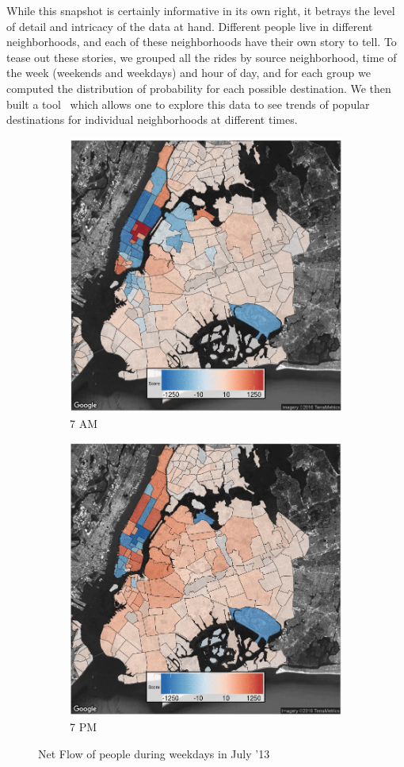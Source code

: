 \documentclass[twocolumn]{article}
\begin{document}
While this snapshot is certainly informative in its own right, it betrays the level of detail and intricacy of the data at hand. Different people live in different neighborhoods, and each of these neighborhoods have their own story to tell. To tease out these stories, we grouped all the rides by source neighborhood, time of the week (weekends and weekdays) and hour of day, and for each group we computed the distribution of probability for each possible destination. We then built a tool~\cite{DS3:2016} which allows one to explore this data to see trends of popular destinations for individual neighborhoods at different times. 


\begin{figure}[h]
 
\begin{subfigure}{0.5\textwidth}
\centering
\includegraphics[width=0.75\linewidth]{7am} 
\caption{7 AM}
\label{fig:7am}
\end{subfigure}
\begin{subfigure}{0.5\textwidth}
\centering
\includegraphics[width=0.75\linewidth]{7pm}
\caption{7 PM}
\label{fig:7pm}
\end{subfigure}
 
\caption{Net Flow of people during weekdays in July '13}
\label{fig:flow}
\end{figure}
\end{document}
